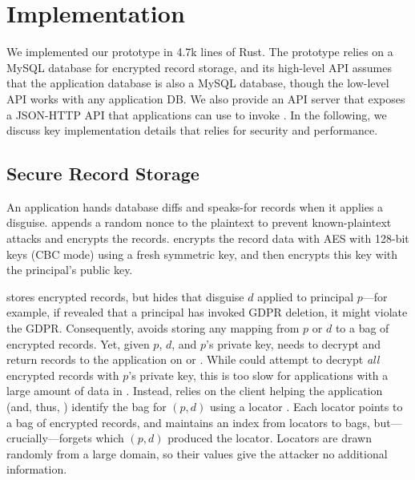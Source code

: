 \section{Implementation}
\label{s:impl}

%
We implemented our \sys prototype in 4.7k lines of Rust.
%
The prototype relies on a MySQL database for encrypted record storage, and
its high-level API assumes that the application database is also a MySQL
database, though the low-level API works with any application DB.
%
We also provide an API server that exposes a JSON-HTTP API that applications
can use to invoke \sys.
%
In the following, we discuss key implementation details that \sys relies for
security and performance.
%

\subsection{Secure Record Storage}
\label{s:impl-locators}
%
An application hands \sys database diffs and speaks-for records when it applies
a disguise.
%
\sys appends a random nonce to the plaintext to prevent known-plaintext attacks
and encrypts the records.
%
\sys encrypts the record data with AES with 128-bit keys (CBC mode) using a
fresh symmetric key, and then encrypts this key with the principal's public key.
%

%
\sys stores encrypted records, but hides that disguise $d$ applied to
principal $p$---for example, if \sys revealed that a principal has invoked
GDPR deletion, it might violate the GDPR.
%
Consequently, \sys avoids storing any mapping from $p$ or $d$ to a bag of
encrypted records.
%
Yet, given $p$, $d$, and $p$'s private key, \sys needs to decrypt and return
records to the application on  or .
%
While \sys could attempt to decrypt \emph{all} encrypted records with $p$'s
private key, this is too slow for applications with a large amount
of data in \sys.
%
Instead, \sys relies on the client helping the application (and, thus, \sys)
identify the bag for $(p, d)$ using a locator .
%
Each locator points to a bag of encrypted records, and \sys maintains an index
from locators to bags, but---crucially---forgets which $(p, d)$ produced the
locator.
%
Locators are drawn randomly from a large domain, so their values give
the attacker no additional information.
%

